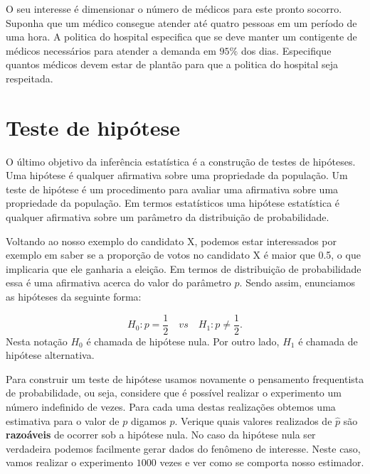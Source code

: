 \documentclass[
  10pt,
  a4paper]{book}
\begin{document}
O seu interesse é dimensionar o número de médicos para este pronto socorro.
Suponha que um médico consegue atender até quatro pessoas em um período de uma hora. A politica do hospital especifica que se deve manter um contigente de médicos necessários para atender a demanda em \(95\%\) dos dias. Especifique quantos médicos devem estar de plantão para que a politica do hospital seja respeitada.

\hypertarget{teste-de-hipuxf3tese}{%
\section{Teste de hipótese}\label{teste-de-hipuxf3tese}}

O último objetivo da inferência estatística é a construção de testes de hipóteses.
Uma hipótese é qualquer afirmativa sobre uma propriedade da população.
Um teste de hipótese é um procedimento para avaliar uma afirmativa sobre uma propriedade da população. Em termos estatísticos uma hipótese estatística é qualquer afirmativa sobre um parâmetro da distribuição de probabilidade.

Voltando ao nosso exemplo do candidato X, podemos estar interessados por exemplo em saber se a proporção de votos no candidato X é maior que 0.5, o que implicaria que ele ganharia a eleição. Em termos de distribuição de probabilidade essa é uma afirmativa acerca do valor do parâmetro \(p\). Sendo assim, enunciamos as hipóteses da seguinte forma:

\[H_0: p = \frac{1}{2} \quad vs \quad H_1: p \neq \frac{1}{2}.\]
Nesta notação \(H_0\) é chamada de hipótese nula. Por outro lado, \(H_1\) é chamada de hipótese alternativa.

Para construir um teste de hipótese usamos novamente o pensamento frequentista de probabilidade, ou seja, considere que é possível realizar o experimento um número indefinido de vezes. Para cada uma destas realizações obtemos uma estimativa para o valor de \(p\) digamos \(\hat{p}\). Verique quais valores realizados de \(\hat{p}\) são \textbf{razoáveis} de ocorrer sob a hipótese nula. No caso da hipótese nula ser verdadeira podemos facilmente gerar dados do fenômeno de interesse. Neste caso, vamos realizar o experimento \(1000\) vezes e ver como se comporta nosso estimador.
\end{document}
